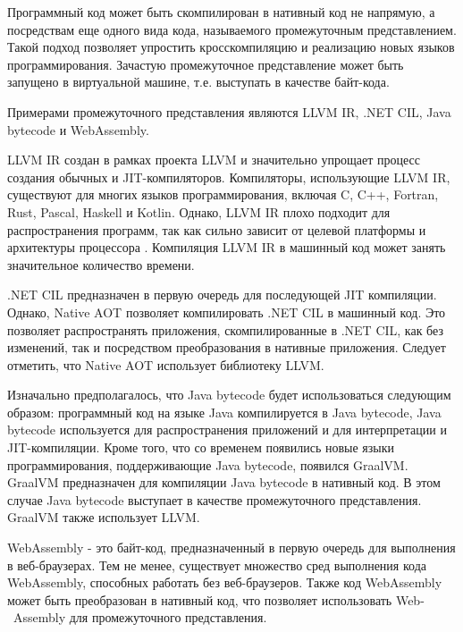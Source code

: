 Программный код может быть скомпилирован в нативный код не напрямую, а посредствам еще одного вида кода, называемого промежуточным представлением.
Такой подход позволяет упростить кросскомпиляцию и реализацию новых языков программирования. 
Зачастую промежуточное представление может быть запущено в виртуальной машине, т.е. выступать в качестве байт-кода.

Примерами промежуточного представления являются LLVM IR, .NET CIL, Java bytecode и WebAssembly.

LLVM IR создан в рамках проекта LLVM и значительно упрощает процесс создания обычных и JIT-компиляторов. 
Компиляторы, использующие LLVM IR, существуют для многих языков программирования, включая C, C++, Fortran, Rust, Pascal, Haskell и Kotlin. 
Однако, LLVM IR плохо подходит для распространения программ, так как сильно зависит от целевой платформы и архитектуры процессора \cite{LLVMNotPortable}.
Компиляция LLVM IR в машинный код может занять значительное количество времени.

.NET CIL предназначен в первую очередь для последующей JIT компиляции. 
Однако, Native AOT позволяет компилировать .NET CIL в машинный код.
Это позволяет распространять приложения, скомпилированные в .NET CIL, как без изменений, так и посредством преобразования в нативные приложения.
Следует отметить, что Native AOT использует библиотеку LLVM.

Изначально предполагалось, что Java bytecode будет использоваться следующим образом: программный код на языке Java компилируется в Java bytecode, Java bytecode используется для распространения приложений и для интерпретации и JIT-компиляции.
Кроме того, что со временем появились новые языки программирования, поддерживающие Java bytecode, появился GraalVM.
GraalVM предназначен для компиляции Java bytecode в нативный код.
В этом случае Java bytecode выступает в качестве промежуточного представления.
GraalVM также использует LLVM.

WebAssembly - это байт-код, предназначенный в первую очередь для выполнения в веб-браузерах.
Тем не менее, существует множество сред выполнения кода WebAssembly, способных работать без веб-браузеров.
Также код WebAssembly может быть преобразован в нативный код, что позволяет использовать Web-~Assembly для промежуточного представления.
